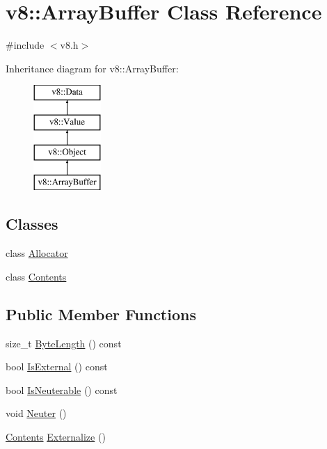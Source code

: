 \hypertarget{classv8_1_1_array_buffer}{}\section{v8\+:\+:Array\+Buffer Class Reference}
\label{classv8_1_1_array_buffer}


{\ttfamily \#include $<$v8.\+h$>$}

Inheritance diagram for v8\+:\+:Array\+Buffer\+:\begin{figure}[H]
\begin{center}
\leavevmode
\includegraphics[height=4.000000cm]{classv8_1_1_array_buffer}
\end{center}
\end{figure}
\subsection*{Classes}
\begin{DoxyCompactItemize}
\item 
class \hyperlink{classv8_1_1_array_buffer_1_1_allocator}{Allocator}
\item 
class \hyperlink{classv8_1_1_array_buffer_1_1_contents}{Contents}
\end{DoxyCompactItemize}
\subsection*{Public Member Functions}
\begin{DoxyCompactItemize}
\item 
size\+\_\+t \hyperlink{classv8_1_1_array_buffer_ab73b98ba6436b57c5a1b3d29429e0199}{Byte\+Length} () const 
\item 
bool \hyperlink{classv8_1_1_array_buffer_a50dd263917559439525048c623425c6f}{Is\+External} () const 
\item 
bool \hyperlink{classv8_1_1_array_buffer_aed177cd83c3368837f740fa2929b3c8d}{Is\+Neuterable} () const 
\item 
void \hyperlink{classv8_1_1_array_buffer_a3420f7d38a8fe20e8f40fb82e6acb325}{Neuter} ()
\item 
\hyperlink{classv8_1_1_array_buffer_1_1_contents}{Contents} \hyperlink{classv8_1_1_array_buffer_a8b90b72486cfacb4fbec157f4803f889}{Externalize} ()
\end{DoxyCompactItemize}
